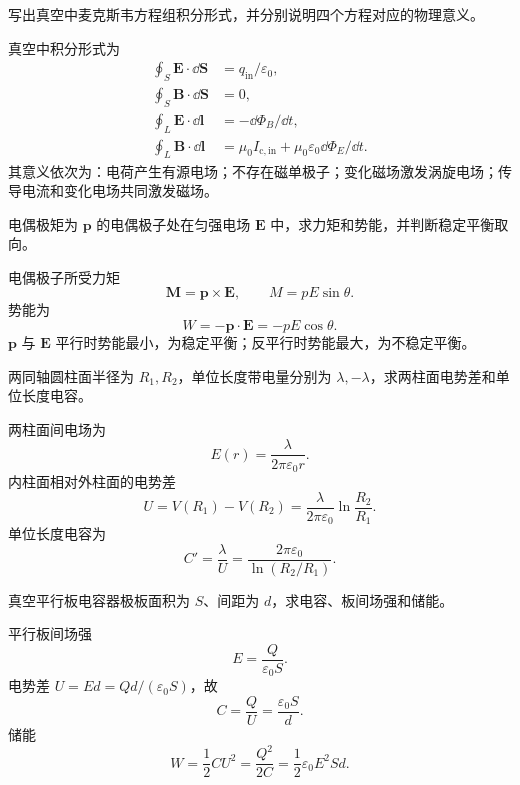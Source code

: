 \begin{exercise}[level=advanced]
写出真空中麦克斯韦方程组积分形式，并分别说明四个方程对应的物理意义。
\begin{solution}
真空中积分形式为
\[
\begin{aligned}
  \oint_S\bm E\cdot\dd\bm S&=q_{\mathrm{in}}/\varepsilon_0,\\
  \oint_S\bm B\cdot\dd\bm S&=0,\\
  \oint_L\bm E\cdot\dd\bm l&=-\dd\Phi_B/\dd t,\\
  \oint_L\bm B\cdot\dd\bm l&=\mu_0I_{\mathrm{c,in}}+\mu_0\varepsilon_0\dd\Phi_E/\dd t.
\end{aligned}
\]
其意义依次为：电荷产生有源电场；不存在磁单极子；变化磁场激发涡旋电场；传导电流和变化电场共同激发磁场。
\end{solution}
\end{exercise}

\begin{exercise}[level=standard]
电偶极矩为 $\bm p$ 的电偶极子处在匀强电场 $\bm E$ 中，求力矩和势能，并判断稳定平衡取向。
\begin{solution}
电偶极子所受力矩
\[
  \bm M=\bm p\times\bm E,\qquad M=pE\sin\theta.
\]
势能为
\[
  W=-\bm p\cdot\bm E=-pE\cos\theta.
\]
$\bm p$ 与 $\bm E$ 平行时势能最小，为稳定平衡；反平行时势能最大，为不稳定平衡。
\end{solution}
\end{exercise}

\begin{exercise}[level=standard]
两同轴圆柱面半径为 $R_1,R_2$，单位长度带电量分别为 $\lambda,-\lambda$，求两柱面电势差和单位长度电容。
\begin{solution}
两柱面间电场为
\[
  E(r)=\frac{\lambda}{2\pi\varepsilon_0r}.
\]
内柱面相对外柱面的电势差
\[
  U=V(R_1)-V(R_2)=\frac{\lambda}{2\pi\varepsilon_0}\ln\frac{R_2}{R_1}.
\]
单位长度电容为
\[
  C'=\frac{\lambda}{U}=\frac{2\pi\varepsilon_0}{\ln(R_2/R_1)}.
\]
\end{solution}
\end{exercise}

\begin{exercise}[level=standard]
真空平行板电容器极板面积为 $S$、间距为 $d$，求电容、板间场强和储能。
\begin{solution}
平行板间场强
\[
  E=\frac{Q}{\varepsilon_0S}.
\]
电势差 $U=Ed=Qd/(\varepsilon_0S)$，故
\[
  C=\frac{Q}{U}=\frac{\varepsilon_0S}{d}.
\]
储能
\[
  W=\frac12CU^2=\frac{Q^2}{2C}=\frac12\varepsilon_0E^2Sd.
\]
\end{solution}
\end{exercise}

